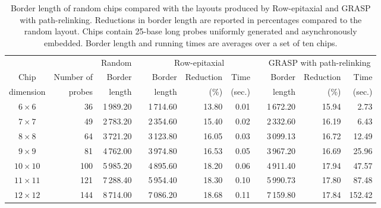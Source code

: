 \documentclass[english]{lni}
\newcommand{\ignore}[1]{}
\begin{document}
\ignore{
The main routine takes
three arguments: matrices $F$ and $D$ and the dimension of the problem~$n$ (in
our case, the number of spots or probes). We generated the matrices using the
formulations presented in Section \ref{sec:qap}.
}

\begin{table}[t]
\caption{Border length of random chips compared with the layouts produced by
Row-epitaxial and GRASP with path-relinking. Reductions in border length are
reported in percentages compared to the random layout. Chips contain 25-base
long probes uniformly generated and asynchronously embedded. Border length and
running times are averages over a set of ten chips.\label{tab:graspr_reptx}}
\vspace*{2ex}
\scriptsize{
\begin{tabular}{crrcrrrcrrr}
          &            & Random & & \multicolumn{3}{c}{Row-epitaxial}  & & \multicolumn{3}{c}{GRASP with path-relinking}  \\ \cline{3-3} \cline{5-7} \cline{9-11}
Chip      & Number of  & Border & & Border & Reduction & Time          & & Border & Reduction & Time   \\
dimension & probes     & length & & length & (\%)      & (sec.)        & & length & (\%)      & (sec.) \\
\hline
$6\times 6$   &  36 & 1\,989.20 & & 1\,714.60 & 13.80 & 0.01 & & 1\,672.20 & 15.94 &   2.73 \\
$7\times 7$   &  49 & 2\,783.20 & & 2\,354.60 & 15.40 & 0.02 & & 2\,332.60 & 16.19 &   6.43 \\
$8\times 8$   &  64 & 3\,721.20 & & 3\,123.80 & 16.05 & 0.03 & & 3\,099.13 & 16.72 &  12.49 \\
$9\times 9$   &  81 & 4\,762.00 & & 3\,974.80 & 16.53 & 0.05 & & 3\,967.20 & 16.69 &  25.96 \\
$10\times 10$ & 100 & 5\,985.20 & & 4\,895.60 & 18.20 & 0.06 & & 4\,911.40 & 17.94 &  47.57 \\
$11\times 11$ & 121 & 7\,288.40 & & 5\,954.40 & 18.30 & 0.10 & & 5\,990.73 & 17.80 &  87.48 \\
$12\times 12$ & 144 & 8\,714.00 & & 7\,086.20 & 18.68 & 0.11 & & 7\,159.80 & 17.84 & 152.42 \\
\hline
\end{tabular}}
\end{table}
\end{document}
